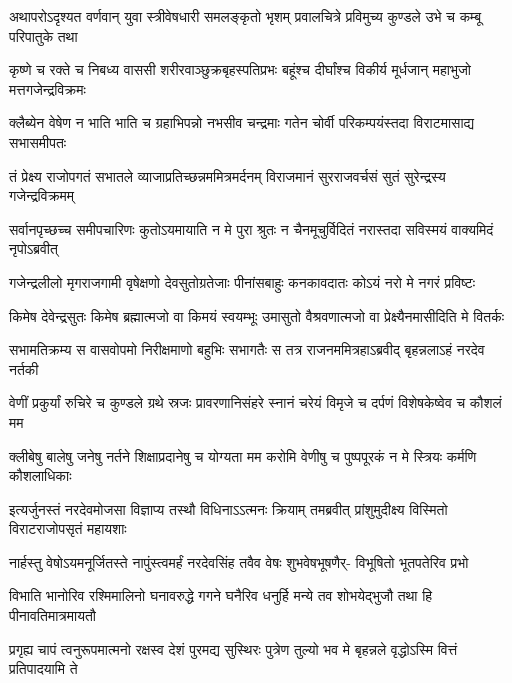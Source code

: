 \fourlineindentedshloka
{अथापरोऽदृश्यत वर्णवान् युवा}
{स्त्रीवेषधारी समलङ्कृतो भृशम्}
{प्रवालचित्रे प्रविमुच्य कुण्डले}
{उभे च कम्बू परिपातुके तथा}


\fourlineindentedshloka
{कृष्णे च रक्ते च निबध्य वाससी}
{शरीरवाञ्छुक्रबृहस्पतिप्रभः}
{बहूंश्च दीर्घांश्च विकीर्य मूर्धजान्}
{महाभुजो मत्तगजेन्द्रविक्रमः}


\fourlineindentedshloka
{क्लैब्येन वेषेण न भाति भाति च}
{ग्रहाभिपन्नो नभसीव चन्द्रमाः}
{गतेन चोर्वी परिकम्पयंस्तदा}
{विराटमासाद्य सभासमीपतः}


\fourlineindentedshloka
{तं प्रेक्ष्य राजोपगतं सभातले}
{व्याजाप्रतिच्छन्नममित्रमर्दनम्}
{विराजमानं सुरराजवर्चसं}
{सुतं सुरेन्द्रस्य गजेन्द्रविक्रमम्}


\fourlineindentedshloka
{सर्वानपृच्छच्च समीपचारिणः}
{कुतोऽयमायाति न मे पुरा श्रुतः}
{न चैनमूचुर्विदितं नरास्तदा}
{सविस्मयं वाक्यमिदं नृपोऽब्रवीत्}




\fourlineindentedshloka
{गजेन्द्रलीलो मृगराजगामी}
{वृषेक्षणो देवसुतोग्रतेजाः}
{पीनांसबाहुः कनकावदातः}
{कोऽयं नरो मे नगरं प्रविष्टः}


\fourlineindentedshloka
{किमेष देवेन्द्रसुतः किमेष}
{ब्रह्मात्मजो वा किमयं स्वयम्भूः}
{उमासुतो वैश्रवणात्मजो वा}
{प्रेक्ष्यैनमासीदिति मे वितर्कः}



\fourlineindentedshloka
{सभामतिक्रम्य स वासवोपमो}
{निरीक्षमाणो बहुभिः सभागतैः}
{स तत्र राजनममित्रहाऽब्रवीद् }
{बृहन्नलाऽहं नरदेव नर्तकी}


\fourlineindentedshloka
{वेणीं प्रकुर्यां रुचिरे च कुण्डले}
{ग्रथे स्रजः प्रावरणानिसंहरे}
{स्नानं चरेयं विमृजे च दर्पणं}
{विशेषकेष्वेव च कौशलं मम}


\fourlineindentedshloka
{क्लीबेषु बालेषु जनेषु नर्तने}
{शिक्षाप्रदानेषु च योग्यता मम}
{करोमि वेणीषु च पुष्पपूरकं}
{न मे स्त्रियः कर्मणि कौशलाधिकाः}


\fourlineindentedshloka
{इत्यर्जुनस्तं नरदेवमोजसा}
{विज्ञाप्य तस्थौ विधिनाऽऽत्मनः क्रियाम्}
{तमब्रवीत् प्रांशुमुदीक्ष्य विस्मितो}
{विराटराजोपसृतं महायशाः}


\fourlineindentedshloka
{नार्हस्तु वेषोऽयमनूर्जितस्ते}
{नापुंस्त्वमर्हं नरदेवसिंह}
{तवैव वेषः शुभवेषभूषणैर्-}
{विभूषितो भूतपतेरिव प्रभो}


\fourlineindentedshloka
{विभाति भानोरिव रश्मिमालिनो}
{घनावरुद्धे गगने घनैरिव}
{धनुर्हि मन्ये तव शोभयेद्भुजौ}
{तथा हि पीनावतिमात्रमायतौ}


\fourlineindentedshloka
{प्रगृह्य चापं त्वनुरूपमात्मनो}
{रक्षस्व देशं पुरमद्य सुस्थिरः}
{पुत्रेण तुल्यो भव मे बृहन्नले}
{वृद्धोऽस्मि वित्तं प्रतिपादयामि ते}


